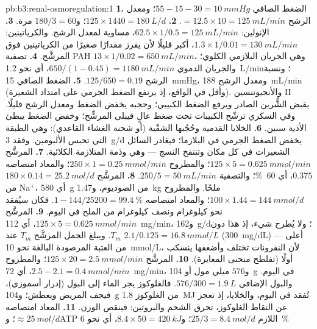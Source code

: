 \begin{solution}{pb:b3:renal-osmoregulation:1}
\textbf{1.} الضغط الصافي $55 - 15 - 30 = \qty{10}{mmHg}$؛ ومعدل الرشح $= 12.5
\times 10 = \qty{125}{mL/min}$.
\textbf{2.} $125\times 1440 = \qty{180}{L/d}$؛ و$180/3 = 60$ مرة.
\textbf{3.} الإنولين: $62.5\times 1/0.5 = \qty{125}{mL/min}$، مساوية
لمعدل الرشح. والكرياتينين: $1.3\times 1/0.01 = \qty{130}{mL/min}$،
أكبر قليلًا لأن  يفرز مقدارًا صغيرًا من
الكرياتينين فوق المرشَّح.
\textbf{4.} تصفية PAH $13\times 1/0.02 = \qty{650}{mL/min}$، وهي
الجريان البلازمي الكلوي؛ والجريان الدموي $650/(1 - 0.45) = \qty{1180}{mL/min}$،
أي نحو \qty{1.2}{L/min}؛ ونسبة الرشح $125/650 = 0.19$.
\textbf{5.} الضغط الصافي \qty{15}{mmHg}، ومعدل الرشح
\qty{188}{mL/min} (وأقل في الواقع، إذ يرتفع الضغط الجرمي على
امتداد الشعيرة). والأنجيوتنسين II يقبض الشُّرين الصادر ويرفع
الضغط الكبيبي؛ وحجبه يخفض الضغط ومعدل الرشح قليلًا. وفي
السكري ترشّح الكبيبات تحت ضغط عالٍ فيبلى المرشِّح؛ وخفض
الضغط يبطئ الأذية سنين.
\textbf{6.} الخلايا القدمية وحُجُبها الشقّية (أو شحنة الغشاء
القاعدي): وهي الطبقة التي تحبس الألبومين. وفقد \qty{3}{g/d}
يخفض الضغط الجرمي في البلازما؛ فيغادر السائل الشعيرات في كل
مكان وتنتفخ النسج --- وهي وذمة المتلازمة الكلائية.
\textbf{7.} المرشَّح $125\times 5 = \qty{0.625}{mmol/min}$؛ والمطروح
$250\times 1 = \qty{0.25}{mmol/min}$؛ والمعاد امتصاصه $0.375$، أي
\qty{60}{\%}؛ والتصفية $250/5 = \qty{50}{mL/min}$.
\textbf{8.} المرشَّح $180\times 0.14 = \qty{25.2}{mol/d}$ من Na$^{+}$،
أي \qty{580}{g} من الصوديوم، و\qty{1.47}{kg} ملحًا. والمطروح $100\times 1.44
= \qty{144}{mmol/d}$؛ والمعاد امتصاصه $1 - 144/\num{25200} = \qty{99.4}{\%}$.
فكان سيُفقد نحو كيلوغرام ونصف كيلوغرام من الملح في اليوم.
\textbf{9.} المرشَّح $125\times 5 = \qty{0.625}{mmol/min}$، أي
\qty{112}{mg/min}، و\qty{162}{g/d}؛ ولا يُطرح شيء، إذ هذا دون
$T_{m}$. ويبلغ الحمل المرشَّح $T_{m}$ عند $2.1/0.125 =
\qty{16.8}{mmol/L}$ (\qty{300}{mg/dL}) --- أعلى من العتبة
المرصودة البالغة نحو \qty{10}{mmol/L}، لأن النفرونات تختلف
وأضعفها ينسكب أولًا (تفلطح منحنى المعايرة).
\textbf{10.} المرشَّح $125\times 20 = \qty{2.5}{mmol/min}$؛ والمطروح
$2.5 - 2.1 = \qty{0.4}{mmol/min}$، أي \qty{72}{mg/min}، و$576$ ميلي مول أو
\qty{104}{g} في اليوم. والبول الإضافي $576/300 = \qty{1.9}{L}$.
فالغلوكوز يجر الماء إلى البول (إدرار أسموزي)، فيجف المريض
ويعطش؛ و\qty{104}{g} من الغلوكوز \qty{1.8}{MJ} تُفقد في اليوم،
والخلايا، إذ تعجز عن التقاط الغلوكوز، تحرق الشحم والبروتين:
فينقص الوزن.
\textbf{11.} المعاد امتصاصه $\approx \qty{25}{mol/d}$؛ وATP اللازم $25/3 =
\qty{8.4}{mol/d}$؛ و$8.4\times 50 = \qty{420}{kJ}$، أي نحو \qty{6}{\%}

\end{solution}
